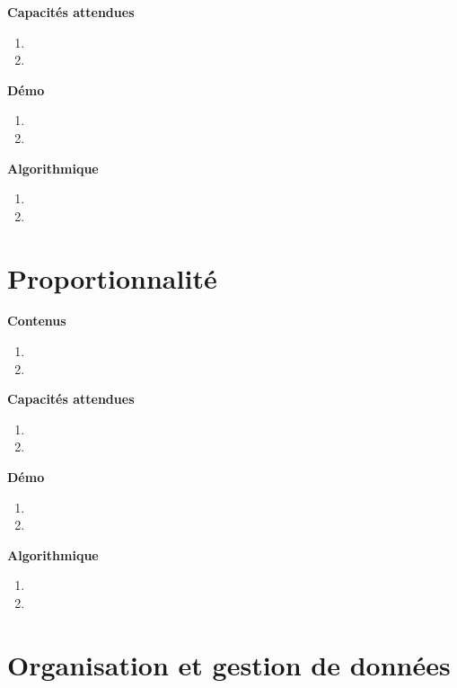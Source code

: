 \documentclass[10pt,a4paper]{article}
\begin{document}
\textbf{Capacités attendues}

\begin{enumerate}
\item 
\item 
\end{enumerate}

\textbf{Démo}

\begin{enumerate}
\item 
\item 
\end{enumerate}

\textbf{Algorithmique}

\begin{enumerate}
\item 
\item 
\end{enumerate}

\section{Proportionnalité}

\textbf{Contenus}

\begin{enumerate} 
\item 
\item 
\end{enumerate}


\textbf{Capacités attendues}

\begin{enumerate}
\item 
\item 
\end{enumerate}

\textbf{Démo}

\begin{enumerate}
\item 
\item 
\end{enumerate}

\textbf{Algorithmique}

\begin{enumerate}
\item 
\item 
\end{enumerate}

\section{Organisation et gestion de données}
\end{document}
